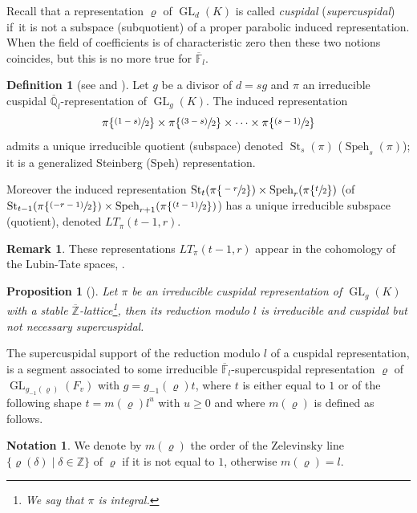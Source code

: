 \documentclass[JEP,XML,SOM,Unicode,published]{cedram}
\let\sep\mid
\newcommand{\psfrac}[2]{\sfrac{(#1)}{#2}}
\DeclareMathOperator{\GL}{GL}
\theoremstyle{plain}
\newtheorem{prop}[equation]{Proposition}
\theoremstyle{definition}
\newtheorem{defin}[equation]{Definition}
\newtheorem*{remark}{Remark}
\newtheorem{nota}[equation]{Notation}
\numberwithin{equation}{subsection}
\newcommand\Fm{{\mathbb F}}
\newcommand\Qm{{\mathbb Q}}
\newcommand\Zm{{\mathbb Z}}
\DeclareMathOperator{\speh}{Speh}
\DeclareMathOperator{\st}{St}
\begin{document}
Recall that a representation
$\varrho$ of $\GL_d(K)$ is called \emph{cuspidal} (\resp \emph{supercuspidal})
if~it is not a subspace (\resp subquotient) of a proper parabolic induced representation.
When the field of coefficients is of characteristic zero then these two notions coincides,
but this is no more true for $\overline \Fm_l$.

\begin{defin}[{see \cite[\S9]{zelevinski2} and \cite[\S1.4]{boyer-compositio}}] \label{defi-rep}
Let $g$ be a divisor of $d=sg$ and $\pi$ an irreducible cuspidal
$\overline \Qm_l$-representation of $\GL_g(K)$.
The induced representation
\[
\pi\{\psfrac{1-s}{2}\} \times \pi \{\psfrac{3-s}{2}\} \times \cdots \times \pi \{\psfrac{s-1}{2}\}
\]
admits a unique irreducible quotient (\resp subspace) denoted $\st_s(\pi)$ (\resp $\speh_s(\pi)$); it is a generalized Steinberg (\resp Speh) representation.

Moreover the induced representation $\st_t(\pi \{\sfrac{-r}{2}\}) \times \speh_r(\pi \{\sfrac{t}{2}\})$
(\resp of $\st_{t-1}(\pi \{\psfrac{-r-1}{2}\}) \times \speh_{r+1}(\pi \{\psfrac{t-1}{2}\})$)
has a unique irreducible subspace (\resp quotient), denoted
$LT_\pi(t-1,r)$.
\end{defin}

\begin{remark}
These representations $LT_\pi(t-1,r)$ appear in the cohomology of the Lubin-Tate
spaces, \cf \cite{boyer-invent2}.
\end{remark}

\begin{prop}[{\cf \cite[III.5.10]{vigneras-livre}}] \label{prop-red-modl}
Let $\pi$ be an irreducible cuspidal representation of $\GL_g(K)$ with a stable
$\overline \Zm$-lattice\footnote{We say that $\pi$ is integral.}, then its reduction modulo $l$
is irreducible and cuspidal but not necessary supercuspidal.
\end{prop}

The supercuspidal support of the reduction modulo $l$ of a cuspidal representation,
is a segment associated to some irreducible $\overline \Fm_l$-supercuspidal representation
$\varrho$ of $\GL_{g_{-1}(\varrho)}(F_v)$ with $g=g_{-1}(\varrho) t$, where $t$ is
either equal to $1$ or of the following shape
$t=m(\varrho)l^u$ with $u \geq 0$ and where $m(\varrho)$ is defined as follows.

\begin{nota} \label{nota-mvarrho}
We denote by $m(\varrho)$ the order of the Zelevinsky line
$\{\varrho(\delta)\sep \delta \in \Zm\}$ of
$\varrho$ if it is not equal to $1$, otherwise $m(\varrho)=l$.
\end{nota}
\end{document}
